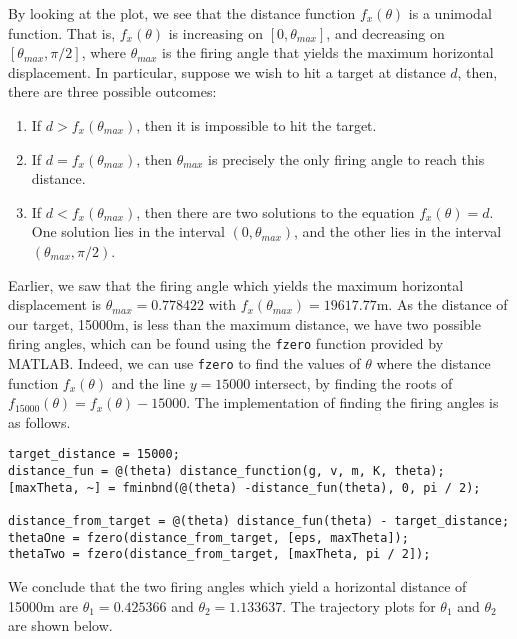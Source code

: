 \noindent
By looking at the plot, we see that the distance function $f_{x}(\theta)$ is a unimodal function. That is, $f_{x}(\theta)$ is increasing on $[0, \theta_{max}]$, and decreasing on $[\theta_{max}, \pi / 2]$, where $\theta_{max}$ is the firing angle that yields the maximum horizontal displacement. In particular, suppose we wish to hit a target at distance $d$, then, there are three possible outcomes:
\begin{enumerate}
	\item If $d > f_x(\theta_{max})$, then it is impossible to hit the target.
	\item If $d = f_x(\theta_{max})$, then $\theta_{max}$ is precisely the only firing angle to reach this distance.
	\item If $d < f_x(\theta_{max})$, then there are two solutions to the equation $f_x(\theta) = d$. One solution lies in the interval $(0, \theta_{max})$, and the other lies in the interval $(\theta_{max}, \pi / 2)$.
\end{enumerate}

\noindent
Earlier, we saw that the firing angle which yields the maximum horizontal displacement is $\theta_{max} = 0.778422$ with $f_x(\theta_{max}) = 19617.77$m. As the distance of our target, 15000m, is less than the maximum distance, we have two possible firing angles, which can be found using the \lstinline|fzero| function provided by MATLAB. Indeed, we can use \lstinline|fzero| to find the values of $\theta$ where the distance function $f_x(\theta)$ and the line $y = 15000$ intersect, by finding the roots of $f_{15000}(\theta) = f_x(\theta) - 15000$. The implementation of finding the firing angles is as follows.

\begin{lstlisting}
target_distance = 15000;
distance_fun = @(theta) distance_function(g, v, m, K, theta);
[maxTheta, ~] = fminbnd(@(theta) -distance_fun(theta), 0, pi / 2);

distance_from_target = @(theta) distance_fun(theta) - target_distance;
thetaOne = fzero(distance_from_target, [eps, maxTheta]);
thetaTwo = fzero(distance_from_target, [maxTheta, pi / 2]);
\end{lstlisting}

\noindent
We conclude that the two firing angles which yield a horizontal distance of 15000m are $\theta_1 = 0.425366$ and $\theta_2 = 1.133637$. The trajectory plots for $\theta_1$ and $\theta_2$ are shown below.



